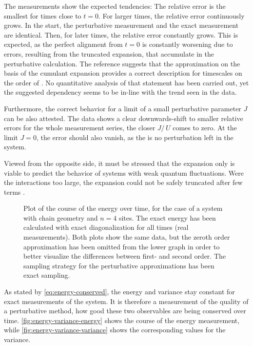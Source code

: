 The measurements show the expected tendencies: The relative error is the smallest for times close to $t=0$. For larger times, the relative error continuously grows.
In the start, the perturbative measurement and the exact measurement are identical.
Then, for later times, the relative error constantly grows.
This is expected, as the perfect alignment from $t=0$ is constantly worsening due to errors, resulting from the truncated expansion, that accumulate in the perturbative calculation.
The reference \cite{variationalClassicalNetworksPaper} suggests that the approximation on the basis of the cumulant expansion provides a correct description for timescales on the order of .
No quantitative analysis of that statement has been carried out, yet the suggested dependency seems to be in-line with the trend seen in the data.

Furthermore, the correct behavior for a limit of a small perturbative parameter $J$ can be also attested.
The data shows a clear downwards-shift to smaller relative errors for the whole measurement series, the closer $J/\,U$ comes to zero.
At the limit $J=0$, the error should also vanish, as the is no perturbation left in the system.

Viewed from the opposite side, it must be stressed that the expansion only is viable to predict the behavior of systems with weak quantum fluctuations. 
Were the interactions too large, the expansion could not be safely truncated after few terms \cite{variationalClassicalNetworksPaper}.

\begin{figure}[htbp]
    \centering
    \caption{
            Plot of the course of the energy over time, for the case of a system with chain geometry and $n=4$ sites.
            The exact energy has been calculated with exact diagonalization for all times (real measurements).
            Both plots show the same data, but the zeroth order approximation has been omitted from the lower graph in order to better visualize the differences between first- and second order.
            The sampling strategy for the perturbative approximations has been exact sampling.
        }
    \label{fig:energy-variance-energy}
\end{figure}
    
As stated by \autoref{eq:energy-conserved}, the energy and variance stay constant for exact measurements of the system.
It is therefore a measurement of the quality of a perturbative method, how good these two observables are being conserved over time.
\autoref{fig:energy-variance-energy} shows the course of the energy measurement, while \autoref{fig:energy-variance-variance} shows the corresponding values for the variance.

